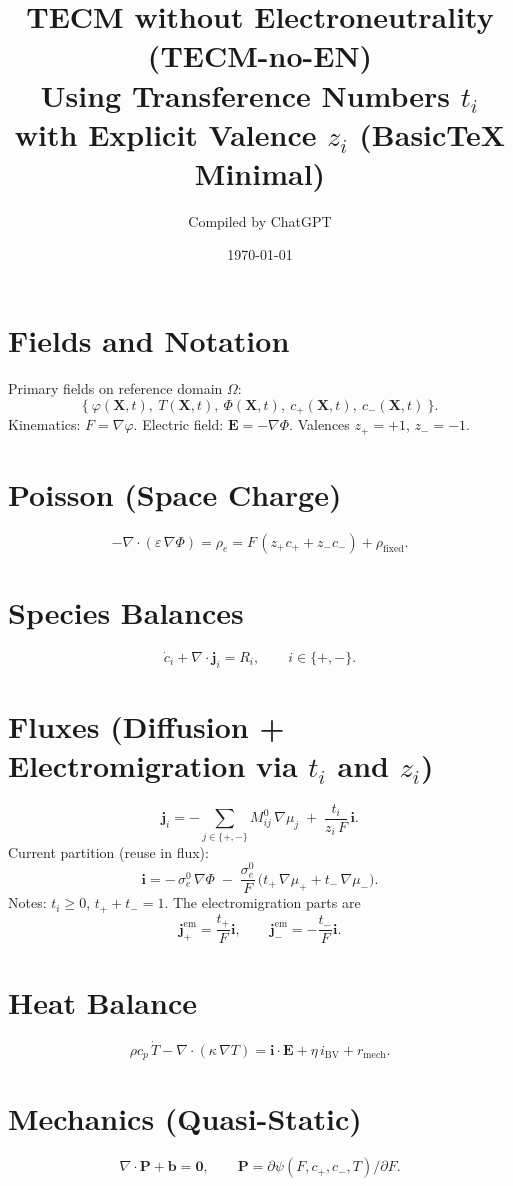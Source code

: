 \documentclass[11pt]{article}
\title{TECM without Electroneutrality (TECM-no-EN) \\
\large Using Transference Numbers $t_i$ with Explicit Valence $z_i$ (BasicTeX Minimal)}
\author{Compiled by ChatGPT}
\date{\today}
\begin{document}
\maketitle

\section*{Fields and Notation}
Primary fields on reference domain $\Omega$:
\[
\{\ \varphi(\mathbf X,t),\ T(\mathbf X,t),\ \Phi(\mathbf X,t),\ c_+(\mathbf X,t),\ c_-(\mathbf X,t)\ \}.
\]
Kinematics: $F=\nabla\varphi$. Electric field: $\mathbf E=-\nabla\Phi$. Valences $z_{+}=+1$, $z_{-}=-1$.

\section*{Poisson (Space Charge)}
\[
-\nabla\cdot(\varepsilon\,\nabla\Phi)
= \rho_e
= F\,(z_+ c_+ + z_- c_-)+\rho_{\mathrm{fixed}}.
\]

\section*{Species Balances}
\[
\dot c_i + \nabla\cdot \mathbf j_i = R_i, \qquad i\in\{+,-\}.
\]

\section*{Fluxes (Diffusion + Electromigration via $t_i$ and $z_i$)}
\[
\mathbf j_i
= -\sum_{j\in\{+,-\}} M^0_{ij}\,\nabla \mu_j
\;+\; \frac{t_i}{z_i\,F}\,\mathbf i.
\]
Current partition (reuse in flux):
\[
\mathbf i
= -\,\sigma_e^0\,\nabla\Phi
\;-\;\frac{\sigma_e^0}{F}\,\big(t_+\,\nabla\mu_+ + t_-\,\nabla\mu_-\big).
\]
Notes: $t_i\ge 0$, $t_+ + t_- = 1$. The electromigration parts are
\[
\mathbf j_+^{\mathrm{em}}=\frac{t_+}{F}\mathbf i,\qquad
\mathbf j_-^{\mathrm{em}}=-\frac{t_-}{F}\mathbf i.
\]

\section*{Heat Balance}
\[
\rho c_p \,\dot T - \nabla\cdot(\kappa\,\nabla T)
= \mathbf i\cdot\mathbf E + \eta\, i_{\mathrm{BV}} + r_{\mathrm{mech}}.
\]

\section*{Mechanics (Quasi-Static)}
\[
\nabla\cdot \mathbf P + \mathbf b = \mathbf 0, 
\qquad \mathbf P=\partial \psi(F,c_+,c_-,T)/\partial F.
\]
\end{document}
